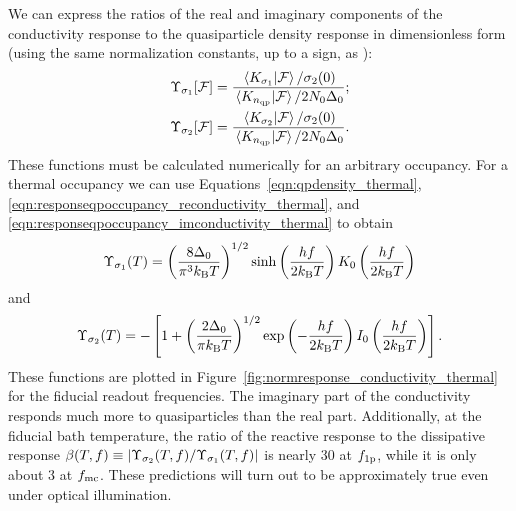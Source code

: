 We can express the ratios of the real and imaginary components of the conductivity response to the quasiparticle density response in dimensionless form (using the same normalization constants, up to a sign, as \textcite{Zmuidzinas2012ARCMP}):
\begin{align}
\begin{split}
\Upsilon_{\sigma_1}[\mathcal{F}]
  &=
  \frac{\braket*{K_{\sigma_1}}{\mathcal{F}} / \sigma_2(0)}{\braket*{K_{n_{\mathrm{qp}}}}{\mathcal{F}} / 2 N_0 \Delta_0}; \\
\Upsilon_{\sigma_2}[\mathcal{F}]
  &=
  \frac{\braket*{K_{\sigma_2}}{\mathcal{F}} / \sigma_2(0)}{\braket*{K_{n_{\mathrm{qp}}}}{\mathcal{F}} / 2 N_0 \Delta_0}.
\end{split}
\label{eqn:normresponse_conductivity}
\end{align}
These functions must be calculated numerically for an arbitrary occupancy.
For a thermal occupancy we can use Equations~\ref{eqn:qpdensity_thermal}, \ref{eqn:responseqpoccupancy_reconductivity_thermal}, and \ref{eqn:responseqpoccupancy_imconductivity_thermal} to obtain
\begin{equation}
\Upsilon_{\sigma_1}(T)
  =
  \left( \frac{8 \Delta_0}{\pi^3 k_\mathrm{B} T} \right)^{1/2}
  \sinh \left( \frac{h f}{2 k_\mathrm{B} T} \right)
  K_0 \left( \frac{h f}{2 k_\mathrm{B} T} \right)
\label{eqn:normresponse_reconductivity_thermal}
\end{equation}
and
\begin{equation}
\Upsilon_{\sigma_2}(T)
  =
  - \left[
  1 + \left( \frac{2 \Delta_0}{\pi k_\mathrm{B} T} \right)^{1/2}
  \exp \left( -\frac{h f}{2 k_\mathrm{B} T} \right)
  I_0 \left( \frac{h f}{2 k_\mathrm{B} T} \right)
  \right].
\label{eqn:normresponse_imconductivity_thermal}
\end{equation}
These functions are plotted in Figure~\ref{fig:normresponse_conductivity_thermal} for the fiducial readout frequencies.
The imaginary part of the conductivity responds much more to quasiparticles than the real part.
Additionally, at the fiducial bath temperature, the ratio of the reactive response to the dissipative response
$\beta(T, f)
  \equiv
  |\Upsilon_{\sigma_2}(T, f) / \Upsilon_{\sigma_1}(T, f)|$
is nearly 30 at $f_{\mathrm{1p}}$, while it is only about 3 at $f_{\mathrm{mc}}$.
These predictions will turn out to be approximately true even under optical illumination.

